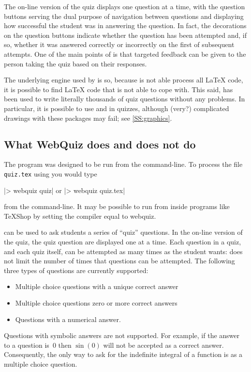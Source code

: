 \documentclass[svgnames]{article}
\begin{document}

    The on-line version of the quiz displays one question at a time,
    with the question buttons serving the dual purpose of navigation
    between questions and displaying how successful the student was
    in answering the question. In fact, the decorations on the question
    buttons indicate whether the question has been attempted and, if so,
    whether it was answered correctly or incorrectly on the first of
    subsequent attempts. One of the main points of \WebQuiz is that
    targeted feedback can be given to the person taking the quiz based
    on their responses.

    The underlying engine used by \WebQuiz is  so, because
     is not able process all \LaTeX{} code, it is possible to
    find \LaTeX{} code that \WebQuiz is not able to cope with.
    This said, \WebQuiz has been used to write literally thousands of quiz
    questions without any problems. In particular, it is possible to use
     and  in \WebQuiz quizzes, although
    (very?) complicated drawings with these packages may fail; see
    \autoref{SS:graphics}.

\subsection{What WebQuiz does and does not do}

    The \WebQuiz program was designed to be run from the command-line.
    To process the file \texttt{quiz.tex} using \WebQuiz you would
    type

    \BashCode|> webquiz quiz| \qquad or \qquad
    \BashCode|> webquiz quiz.tex|

    \noindent from the command-line. It may be possible to run \WebQuiz
    from inside programs like \TeX Shop by setting the compiler equal to
    \textsf{webquiz}.

    \WebQuiz can be used to ask students a series of ``quiz'' questions. In
    the on-line version of the quiz, the quiz question are displayed one
    at a time. Each question in a quiz, and each quiz itself, can be
    attempted as many times as the student wants: \WebQuiz does not
    limit the number of times that questions can be attempted.
    The following three types of questions are currently supported:
    \begin{itemize}
      \item Multiple choice questions with a unique correct answer
      \item Multiple choice questions zero or more correct answers
      \item Questions with a numerical answer.
    \end{itemize}
    Questions with symbolic answers are not supported.  For example, if
    the answer to a question is~$0$ then $\sin(0)$ will not be accepted
    as a correct answer. Consequently, the only way to ask for the
    indefinite integral of a function is as a multiple choice question.
\end{document}
